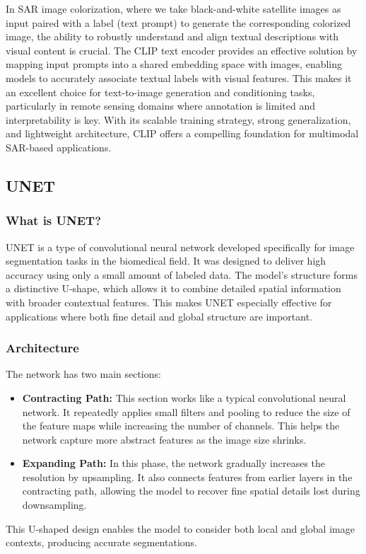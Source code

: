 In SAR image colorization, where we take black-and-white satellite images as input paired with a label (text prompt) to generate the corresponding colorized image, the ability to robustly understand and align textual descriptions with visual content is crucial. The CLIP text encoder provides an effective solution by mapping input prompts into a shared embedding space with images, enabling models to accurately associate textual labels with visual features. This makes it an excellent choice for text-to-image generation and conditioning tasks, particularly in remote sensing domains where annotation is limited and interpretability is key. With its scalable training strategy, strong generalization, and lightweight architecture, CLIP offers a compelling foundation for multimodal SAR-based applications.



\subsection{UNET}

\subsubsection{What is UNET?}
UNET is a type of convolutional neural network developed specifically for image segmentation tasks in the biomedical field. It was designed to deliver high accuracy using only a small amount of labeled data. The model's structure forms a distinctive U-shape, which allows it to combine detailed spatial information with broader contextual features. This makes UNET especially effective for applications where both fine detail and global structure are important.

\subsubsection{Architecture}
The network has two main sections:
\begin{itemize}
    \item \textbf{Contracting Path:} This section works like a typical convolutional neural network. It repeatedly applies small filters and pooling to reduce the size of the feature maps while increasing the number of channels. This helps the network capture more abstract features as the image size shrinks.
    \item \textbf{Expanding Path:} In this phase, the network gradually increases the resolution by upsampling. It also connects features from earlier layers in the contracting path, allowing the model to recover fine spatial details lost during downsampling.
\end{itemize}
This U-shaped design enables the model to consider both local and global image contexts, producing accurate segmentations.\cite{ronneberger2015unetconvolutionalnetworksbiomedical}

